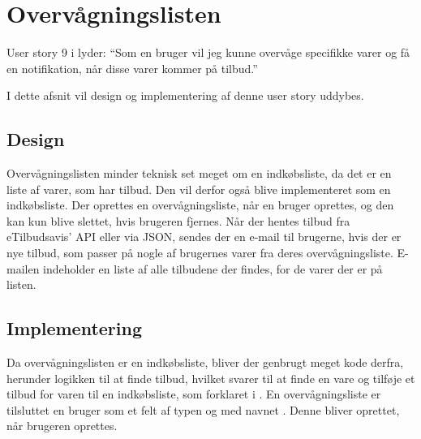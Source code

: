 \section{Overvågningslisten}

User story 9 i  lyder: ``Som en bruger vil jeg kunne overvåge specifikke varer og få en notifikation, når disse varer kommer på tilbud.''

I dette afsnit vil design og implementering af denne user story uddybes.

\subsection{Design}
Overvågningslisten minder teknisk set meget om en indkøbsliste, da det er en liste af varer, som har tilbud.
Den vil derfor også blive implementeret som en indkøbsliste. 
Der oprettes en overvågningsliste, når en bruger oprettes, og den kan kun blive slettet, hvis brugeren fjernes.
Når der hentes tilbud fra eTilbudsavis' API eller via JSON, sendes der en e-mail til brugerne, hvis der er nye tilbud, som passer på nogle af brugernes varer fra deres overvågningsliste. 
E-mailen indeholder en liste af alle tilbudene der findes, for de varer der er på listen.

\subsection{Implementering} 
Da overvågningslisten er en indkøbsliste, bliver der genbrugt meget kode derfra, herunder logikken til at finde tilbud, hvilket svarer til at finde en vare og tilføje et tilbud for varen til en indkøbsliste, som forklaret i .
En overvågningsliste er tilsluttet en bruger som et felt af typen  og med navnet . 
Denne  bliver oprettet, når brugeren oprettes.

